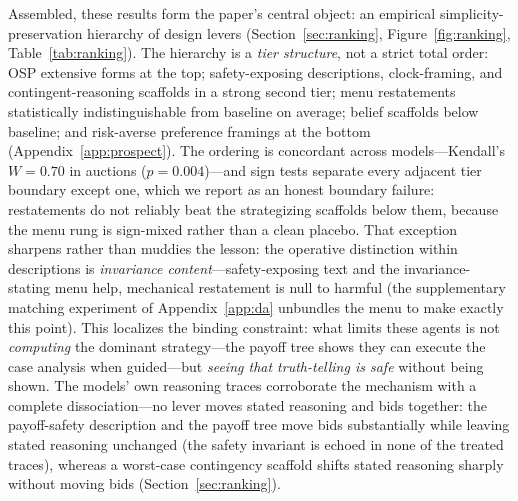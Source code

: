 Assembled, these results form the paper's central object: an empirical simplicity-preservation hierarchy of design levers (Section~\ref{sec:ranking}, Figure~\ref{fig:ranking}, Table~\ref{tab:ranking}). The hierarchy is a \emph{tier structure}, not a strict total order: OSP extensive forms at the top; safety-exposing descriptions, clock-framing, and contingent-reasoning scaffolds in a strong second tier; menu restatements statistically indistinguishable from baseline on average; belief scaffolds below baseline; and risk-averse preference framings at the bottom (Appendix~\ref{app:prospect}). The ordering is concordant across models---Kendall's $W=0.70$ in auctions ($p=0.004$)---and sign tests separate every adjacent tier boundary except one, which we report as an honest boundary failure: restatements do not reliably beat the strategizing scaffolds below them, because the menu rung is sign-mixed rather than a clean placebo. That exception sharpens rather than muddies the lesson: the operative distinction within descriptions is \emph{invariance content}---safety-exposing text and the invariance-stating menu help, mechanical restatement is null to harmful (the supplementary matching experiment of Appendix~\ref{app:da} unbundles the menu to make exactly this point). This localizes the binding constraint: what limits these agents is not \emph{computing} the dominant strategy---the payoff tree shows they can execute the case analysis when guided---but \emph{seeing that truth-telling is safe} without being shown. The models' own reasoning traces corroborate the mechanism with a complete dissociation---no lever moves stated reasoning and bids together: the payoff-safety description and the payoff tree move bids substantially while leaving stated reasoning unchanged (the safety invariant is echoed in none of the treated traces), whereas a worst-case contingency scaffold shifts stated reasoning sharply without moving bids (Section~\ref{sec:ranking}).

